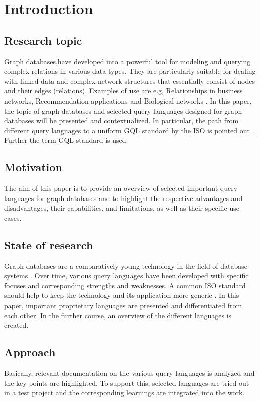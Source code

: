 \chapter{Introduction}
\label{ch:intro}

\section{Research topic}
\label{sec:intro:research_topic}
Graph databases‚have developed into a powerful tool for modeling and querying complex relations in various data types. 
They are particularly suitable for dealing with linked data and complex network structures that essentially consist of nodes and their edges (relations). 
Examples of use are e.g, Relationships in business networks, Recommendation applications
and Biological networks \citep{yuanyuan_tian_world_2022}.
In this paper, the topic of graph databases and selected query languages designed for graph databases will be presented and contextualized. 
In particular, 
the path from different query languages to a uniform \ac{GQL} standard by the \ac{ISO} is pointed out \citep{hare_isoiec_2024}.
Further the term \ac{GQL} standard is used. 

\section{Motivation}
\label{sec:intro:motivation}
The aim of this paper is to provide an overview of selected important 
query languages for graph databases and to highlight the respective advantages and disadvantages, 
their capabilities, and limitations, as well as their specific use cases. 

\section{State of research}
\label{sec:intro:state_of_research}
Graph databases are a comparatively young technology in the field of database systems \citep{hare_isoiec_2024}.  
Over time, various query languages have been developed with specific focuses and corresponding strengths and weaknesses.
A common ISO standard should help to keep the technology and its application more generic \citep{duckham_matt_gis_2024}.
In this paper, important proprietary languages are presented and differentiated from each other. 
In the further course, an overview of the different languages is created.

\section{Approach}
\label{sec:intro:approach}
Basically, relevant documentation on the various query languages is analyzed 
and the key points are highlighted. 
To support this, selected languages are tried out in a test project 
and the corresponding learnings are integrated into the work.

